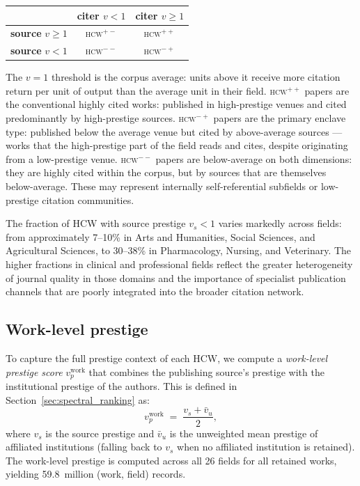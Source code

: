 \begin{center}
\renewcommand{\arraystretch}{1.3}
\begin{tabular}{c|cc}
 & \textbf{citer } $v < 1$ & \textbf{citer } $v \geq 1$ \\
\hline
\textbf{source } $v \geq 1$ & \textsc{hcw}$^{+-}$ & \textsc{hcw}$^{++}$ \\
\textbf{source } $v < 1$    & \textsc{hcw}$^{--}$ & \textsc{hcw}$^{-+}$ \\
\end{tabular}
\end{center}

The $v = 1$ threshold is the corpus average: units above it receive more
citation return per unit of output than the average unit in their field.
\textsc{hcw}$^{++}$ papers are the conventional highly cited works: published
in high-prestige venues and cited predominantly by high-prestige sources.
\textsc{hcw}$^{-+}$ papers are the primary enclave type: published below the
average venue but cited by above-average sources — works that the high-prestige
part of the field reads and cites, despite originating from a low-prestige
venue.  \textsc{hcw}$^{--}$ papers are below-average on both dimensions: they
are highly cited within the corpus, but by sources that are themselves
below-average.  These may represent internally self-referential subfields or
low-prestige citation communities.

The fraction of HCW with source prestige $v_s < 1$ varies markedly across
fields: from approximately 7--10\% in Arts and Humanities, Social Sciences,
and Agricultural Sciences, to 30--38\% in Pharmacology, Nursing, and
Veterinary.  The higher fractions in clinical and professional fields reflect
the greater heterogeneity of journal quality in those domains and the
importance of specialist publication channels that are poorly integrated into
the broader citation network.

\subsection{Work-level prestige}

To capture the full prestige context of each HCW, we compute a
\emph{work-level prestige score} $v_p^{\mathrm{work}}$ that combines the
publishing source's prestige with the institutional prestige of the authors.
This is defined in Section~\ref{sec:spectral_ranking} as:
\[
  v_p^{\mathrm{work}} \;=\; \frac{v_s + \bar{v}_u}{2},
\]
where $v_s$ is the source prestige and $\bar{v}_u$ is the unweighted mean
prestige of affiliated institutions (falling back to $v_s$ when no affiliated
institution is retained).  The work-level prestige is computed across all 26
fields for all retained works, yielding 59.8~million (work, field) records.

